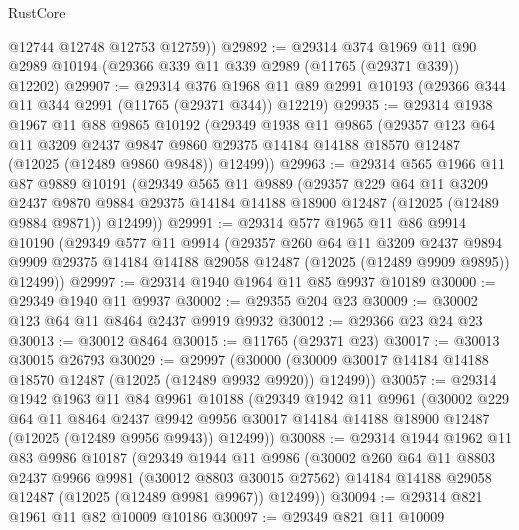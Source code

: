 \begin{lexlean}{RustCore}
\begin{coremodule}
        @12744
        @12748
        @12753
        @12759))
@29892 := @29314
    @374
    @1969
    @11
    @90
    @2989
    @10194
    (@29366 @339 @11 @339 @2989 (@11765 (@29371 @339)) @12202)
@29907 := @29314
    @376
    @1968
    @11
    @89
    @2991
    @10193
    (@29366 @344 @11 @344 @2991 (@11765 (@29371 @344)) @12219)
@29935 := @29314
    @1938
    @1967
    @11
    @88
    @9865
    @10192
    (@29349
      @1938
      @11
      @9865
      (@29357
        @123
        @64
        @11
        @3209
        @2437
        @9847
        @9860
        @29375
        @14184
        @14188
        @18570
        @12487
        (@12025 (@12489 @9860 @9848))
        @12499))
@29963 := @29314
    @565
    @1966
    @11
    @87
    @9889
    @10191
    (@29349
      @565
      @11
      @9889
      (@29357
        @229
        @64
        @11
        @3209
        @2437
        @9870
        @9884
        @29375
        @14184
        @14188
        @18900
        @12487
        (@12025 (@12489 @9884 @9871))
        @12499))
@29991 := @29314
    @577
    @1965
    @11
    @86
    @9914
    @10190
    (@29349
      @577
      @11
      @9914
      (@29357
        @260
        @64
        @11
        @3209
        @2437
        @9894
        @9909
        @29375
        @14184
        @14188
        @29058
        @12487
        (@12025 (@12489 @9909 @9895))
        @12499))
@29997 := @29314 @1940 @1964 @11 @85 @9937 @10189
@30000 := @29349 @1940 @11 @9937
@30002 := @29355 @204 @23
@30009 := @30002 @123 @64 @11 @8464 @2437 @9919 @9932
@30012 := @29366 @23 @24 @23
@30013 := @30012 @8464
@30015 := @11765 (@29371 @23)
@30017 := @30013 @30015 @26793
@30029 := @29997
    (@30000 (@30009 @30017 @14184 @14188 @18570 @12487 (@12025 (@12489 @9932 @9920)) @12499))
@30057 := @29314
    @1942
    @1963
    @11
    @84
    @9961
    @10188
    (@29349
      @1942
      @11
      @9961
      (@30002
        @229
        @64
        @11
        @8464
        @2437
        @9942
        @9956
        @30017
        @14184
        @14188
        @18900
        @12487
        (@12025 (@12489 @9956 @9943))
        @12499))
@30088 := @29314
    @1944
    @1962
    @11
    @83
    @9986
    @10187
    (@29349
      @1944
      @11
      @9986
      (@30002
        @260
        @64
        @11
        @8803
        @2437
        @9966
        @9981
        (@30012 @8803 @30015 @27562)
        @14184
        @14188
        @29058
        @12487
        (@12025 (@12489 @9981 @9967))
        @12499))
@30094 := @29314 @821 @1961 @11 @82 @10009 @10186
@30097 := @29349 @821 @11 @10009

\end{coremodule}
\end{lexlean}
